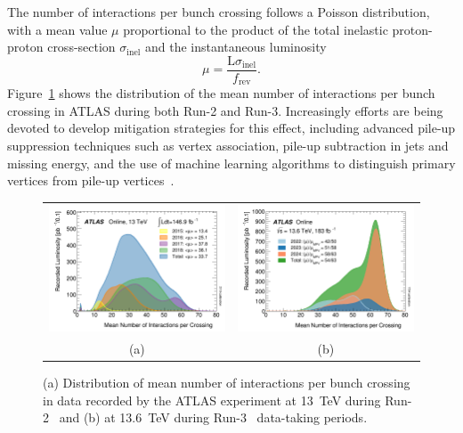 The number of interactions per bunch crossing follows a Poisson distribution, with a mean value $\mu$ proportional to the product of the total inelastic proton-proton cross-section $\sigma_{\text{inel}}$ and the instantaneous luminosity~\cite{pileup}
\begin{equation}
    \mu = \frac{\text{L}\sigma_{\text{inel}}}{f_{\text{rev}}}.
\end{equation}
Figure~\ref{fig:pileup} shows the distribution of the mean number of interactions per bunch crossing in ATLAS during both Run-2 and Run-3.
Increasingly efforts are being devoted to develop mitigation strategies for this effect, including advanced pile-up suppression techniques such as vertex association, pile-up subtraction in jets and missing energy, and the use of machine learning algorithms to distinguish primary vertices from pile-up vertices~\cite{ATL-PHYS-PUB-2023-011,ATLAS:2017pfq,Soyez_2019}.
\begin{figure}[htbp]
    \centering
    \begin{tabular}{cc}
        \includegraphics[width=0.5\linewidth]{images/mu_2015_2018.png} &
        \includegraphics[width=0.5\linewidth]{images/mu_2022_2024.png} \\
        (a) & (b)  \\
    \end{tabular}
    \caption{(a) Distribution of mean number of interactions per bunch crossing in data recorded by the ATLAS experiment at 13~TeV during Run-2~\cite{atlas:Run2lumi} and  (b) at 13.6~TeV during Run-3~\cite{atlas:Run2lumi} data-taking periods.}
    \label{fig:pileup}
    \end{figure}
